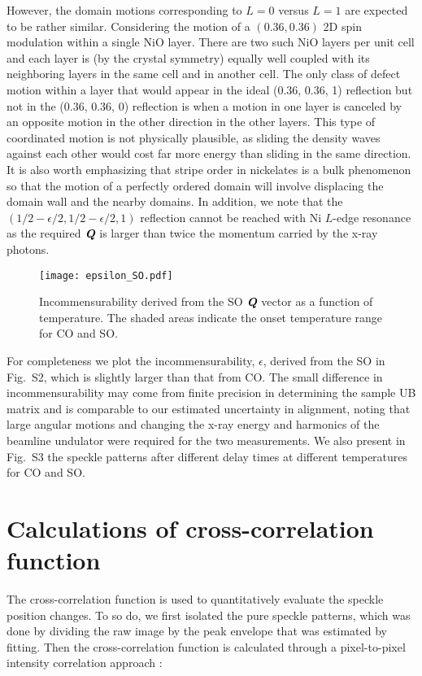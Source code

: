 \documentclass[aps,prl,showpacs,floatfix,onecolumn,superscriptaddress,longbibliography,notitlepage]{revtex4-1}
\def\mathbi#1{\ensuremath{\textbf{\em #1}}}
\def\Q{\mathbi{Q}}
\begin{document}
However, the domain motions corresponding to $L=0$ versus $L=1$ are expected to be rather similar. Considering the motion of a $(0.36, 0.36)$ 2D spin modulation within a single NiO layer. There are two such NiO layers per unit cell and each layer is (by the crystal symmetry) equally well coupled with its neighboring layers in the same cell and in another cell. The only class of defect motion within a layer that would appear in the ideal (0.36, 0.36, 1) reflection but not in the (0.36, 0.36, 0) reflection is when a motion in one layer is canceled by an opposite motion in the other direction in the other layers. This type of coordinated motion is not physically plausible, as sliding the density waves against each other would cost far more energy than sliding in the same direction. It is also worth emphasizing that stripe order in nickelates is a bulk phenomenon so that the motion of a perfectly ordered domain will involve displacing the domain wall and the nearby domains. In addition, we note that the $(1/2-\epsilon/2, 1/2-\epsilon/2, 1)$ reflection cannot be reached with Ni $L$-edge resonance as the required {\Q} is larger than twice the momentum carried by the x-ray photons.

\begin{figure}
\texttt{[image: epsilon\_SO.pdf]}
\caption{Incommensurability derived from the \gls{SO} {\Q} vector as a function of temperature. The shaded areas indicate the onset temperature range for \gls{CO} and \gls{SO}.}
\end{figure}

For completeness we plot the incommensurability, $\epsilon$, derived from the \gls*{SO} in Fig.~S2, which is slightly larger than that from \gls*{CO}. The small difference in incommensurability may come from finite precision in determining the sample UB matrix and is comparable to our estimated uncertainty in alignment, noting that large angular motions and changing the x-ray energy and harmonics of the beamline undulator were required for the two measurements. We also present in Fig.~S3 the speckle patterns after different delay times at different temperatures for \gls{CO} and \gls{SO}.

\section{Calculations of cross-correlation function}

The cross-correlation function is used to quantitatively evaluate the speckle position changes. To so do, we first isolated the pure speckle patterns, which was done by dividing the raw image by the peak envelope that was estimated by fitting. Then the cross-correlation function is calculated through a pixel-to-pixel intensity correlation approach \cite{Chen2019LBCO}:
\end{document}
